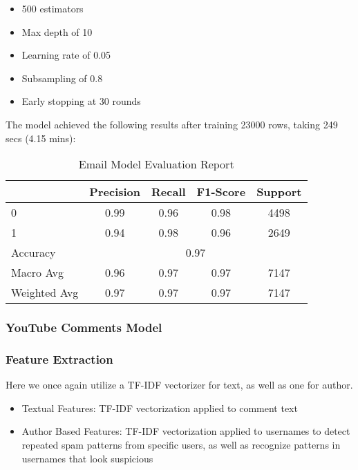\documentclass{article}
\begin{document}
\begin{itemize}
    \item 500 estimators
    \item Max depth of 10
    \item Learning rate of 0.05
    \item Subsampling of 0.8
    \item Early stopping at 30 rounds
\end{itemize}

\noindent
The model achieved the following results after training 23000 rows, taking 249 secs (4.15 mins):

\begin{table}[htbp]
    \centering
    \caption{Email Model Evaluation Report}
    \begin{tabular}{l c c c c}
    \toprule
     & Precision & Recall & F1-Score & Support \\
    \midrule
    0 & 0.99 & 0.96 & 0.98 & 4498 \\
    1 & 0.94 & 0.98 & 0.96 & 2649 \\
    \midrule
    Accuracy & \multicolumn{4}{c}{0.97} \\
    Macro Avg & 0.96 & 0.97 & 0.97 & 7147 \\
    Weighted Avg & 0.97 & 0.97 & 0.97 & 7147 \\
    \bottomrule
    \end{tabular}
    \label{tab:xgboost_evaluation}
\end{table}

\subsubsection{YouTube Comments Model}
\subsubsection*{Feature Extraction}

Here we once again utilize a TF-IDF vectorizer for text, as well as one for author.

\begin{itemize}
    \item Textual Features: TF-IDF vectorization applied to comment text
    \item Author Based Features: TF-IDF vectorization applied to usernames to detect repeated spam patterns from specific users, as well as recognize patterns in usernames that look suspicious
\end{itemize}
\end{document}
